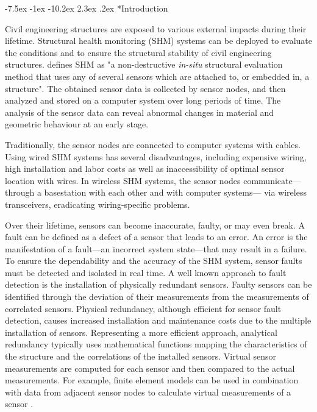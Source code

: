 \documentclass[12pt,a4paper]{scrartcl}
\makeatletter
\renewcommand\section{\@startsection{section}{1}{\z@}%
                     {-7.5ex \@plus -1ex \@minus -10.2ex}%
                     {2.3ex \@plus.2ex}%
                     {\sffamily\large\bfseries}}
\makeatother
\begin{document}

\section*{Introduction}

Civil engineering structures are exposed to various external impacts during their lifetime. 
Structural health monitoring (SHM) systems can be deployed to evaluate the conditions and to ensure the structural stability of civil engineering structures.
\citet{BisbySHM} defines SHM as "a non-destructive \textit{in-situ} structural evaluation method that uses any of several sensors which are attached to, or embedded in, a structure".
The obtained sensor data is collected by sensor nodes, and then analyzed and stored on a computer system over long periods of time. 
The analysis of the sensor data can reveal abnormal changes in material and geometric behaviour at an early stage.

Traditionally, the sensor nodes are connected to computer systems with cables.
Using wired SHM systems has several disadvantages, including expensive wiring, high installation and labor costs as well as inaccessibility of optimal sensor location with wires.
In wireless SHM systems, the sensor nodes communicate---through a basestation with each other and with computer systems--- via wireless transceivers, eradicating wiring-specific problems.

Over their lifetime, sensors can become inaccurate, faulty, or may even break.
A fault can be defined as a defect of a sensor that leads to an error. An error is the manifestation of a fault---an incorrect system state---that may result in a failure.
To ensure the dependability and the accuracy of the SHM system, sensor faults must be detected and isolated in real time. 
A well known approach to fault detection is the installation of physically redundant sensors.
Faulty sensors can be identified through the deviation of their measurements from the measurements of correlated sensors.
Physical redundancy, although efficient for sensor fault detection, causes increased installation and maintenance costs due to the multiple installation of sensors. 
Representing a more efficient approach, analytical redundancy typically uses mathematical functions mapping the characteristics of the structure and the correlations of the installed sensors. Virtual sensor measurements are computed for each sensor and then compared to the actual measurements. 
For example, finite element models can be used in combination with data from adjacent sensor nodes to calculate virtual measurements of a sensor
\citep{Smarsly2014}.
\end{document}
